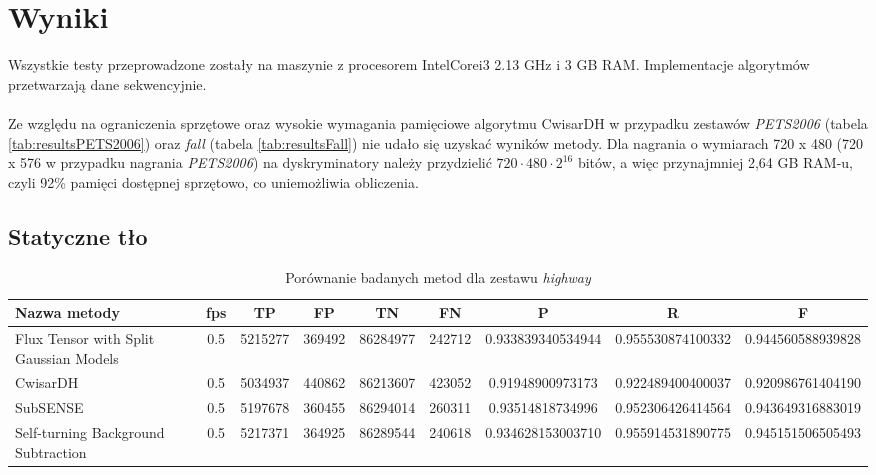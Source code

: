 \section{Wyniki}
Wszystkie testy przeprowadzone zostały na maszynie z procesorem Intel\textregistered Core\texttrademark i3 2.13 GHz i 3 GB RAM. Implementacje algorytmów przetwarzają dane sekwencyjnie.
\paragraph{}
Ze względu na ograniczenia sprzętowe oraz wysokie wymagania pamięciowe algorytmu CwisarDH w przypadku zestawów \textit{PETS2006} (tabela \ref{tab:resultsPETS2006}) oraz \textit{fall} (tabela \ref{tab:resultsFall}) nie udało się uzyskać wyników metody. Dla nagrania o wymiarach 720 x 480 (720 x 576 w przypadku nagrania \textit{PETS2006}) na dyskryminatory należy przydzielić $720 \cdot 480 \cdot 2^{16}$ bitów, a więc przynajmniej 2,64 GB RAM-u, czyli 92\% pamięci dostępnej sprzętowo, co uniemożliwia obliczenia.

\subsection{Statyczne tło}


\begin{table}[h]
\caption{Porównanie badanych metod dla zestawu \textit{highway}}
\label{tab:resultsHighway}
\centering
\begin{tabular}{|l*{8}{|c}|}
  \hline 
  \textbf{Nazwa metody} & \textbf{fps} & \textbf{TP} & \textbf{FP} & \textbf{TN} & \textbf{FN} & \textbf{P} & \textbf{R} & \textbf{F}\\
  \hline
  Flux Tensor with Split Gaussian Models & 0.5 & 5215277 & 369492 & 86284977 & 242712 & 0.933839340534944 & 0.955530874100332 & 0.944560588939828\\
  \hline
  CwisarDH & 0.5 & 5034937 & 440862 & 86213607 & 423052 & 0.91948900973173 & 0.922489400400037 & 0.920986761404190 \\
  \hline
  SubSENSE & 0.5 & 5197678 & 360455 & 86294014 & 260311 & 0.93514818734996 & 0.952306426414564 & 0.943649316883019 \\
  \hline
  Self-turning Background Subtraction & 0.5 & 5217371 & 364925 & 86289544 & 240618 & 0.934628153003710 & 0.955914531890775 & 0.945151506505493 \\
  \hline
\end{tabular}
\end{table}

